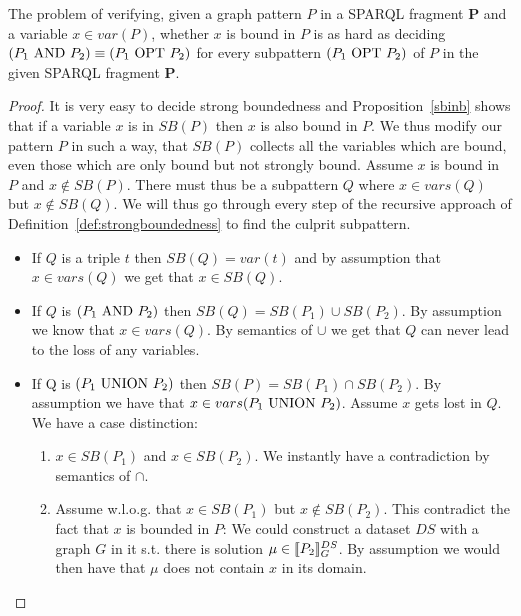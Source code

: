 \begin{theorem}\label{ezprop}
	The problem of verifying, given a graph pattern $P$ in a SPARQL fragment
	$\mathbf{P}$ and a variable $x \in
	var(P)$, whether $x$ is bound in $P$ is as hard as deciding $(P_1 \mbox{ AND } 
	P_2)
	\equiv (P_1 \mbox{ OPT } P_2)$ for every subpattern $(P_1 \mbox{ OPT }  P_2)$ of $P$ in the
	given SPARQL fragment $\mathbf{P}$.
\end{theorem}
\begin{proof}
	It is very easy to decide strong boundedness and Proposition~\ref{sbinb}
	shows that if a variable $x$ is in $SB(P)$ then $x$ is also bound in $P$.
	We thus modify our pattern $P$ in such a way, that $SB(P)$ collects all the
	variables which are bound, even those which are only bound but not strongly
	bound.
	Assume $x$ is bound in $P$ and $x \notin SB(P)$.
	There must thus be a subpattern $Q$ where $x \in vars(Q)$ but $x \notin
	SB(Q)$. We will thus go through every step of the recursive approach of
	Definition~\ref{def:strongboundedness} to find the culprit subpattern.
	\begin{itemize}
		\item If $Q$ is a triple $t$ then $SB(Q) = var(t)$ and by assumption
			that $x \in vars(Q)$ we get that $x \in SB(Q)$. 

		\item If $Q$ is $(P_1 \mbox{ AND } P_2)$ then $SB(Q) = SB(P_1) \cup SB(P_2)$. By
			assumption we know that $x \in vars(Q)$. By semantics of $\cup$ we
			get that $Q$ can never lead to the loss of any variables.
			
		\item If Q is $(P_1 \mbox{ UNION }  P_2)$ then $SB(P) = SB(P_1) \cap SB(P_2)$.
			By assumption we have that $x \in vars(P_1 \mbox{ UNION } P_2)$.
			Assume $x$ gets lost in $Q$. 
			We have a case distinction:
			\begin{enumerate}
				\item $x \in SB(P_1)$ and $x \in SB(P_2)$. We instantly have a
					contradiction by semantics of $\cap$. 

				\item Assume w.l.o.g. that $x \in SB(P_1)$ but $x \notin SB(P_2)$. 
					This contradict the fact that $x$ is bounded in $P$:
					We could construct a dataset $DS$ with a graph $G$ in it s.t. there
					is solution $\mu \in \llbracket P_2
					\rrbracket^{DS}_G$. By assumption we would then have that $\mu$ does not
					contain $x$ in its domain. 
			\end{enumerate}


\end{itemize}
\end{proof}
